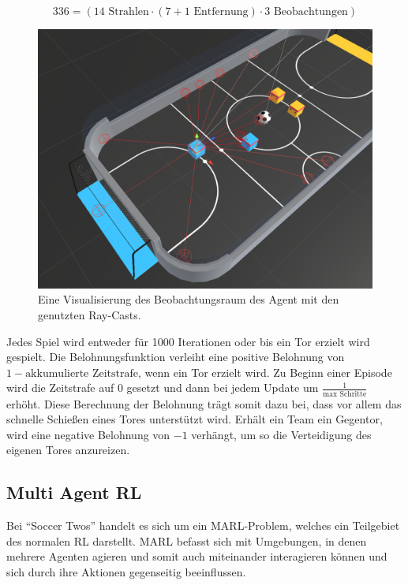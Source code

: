\documentclass[twocolumn]{webofc}
\begin{document}
\[
336 = (14 \text{ Strahlen} \cdot (7 + 1 \text{ Entfernung}) \cdot 3 \text{ Beobachtungen})
\]

\begin{figure}
	\centering
	\includegraphics[width=\columnwidth]{img/agent_observations.png}
	\caption{Eine Visualisierung des Beobachtungsraum des Agent mit den genutzten Ray-Casts.  \cite{soccertwos}}
	\label{fig:ray-casts}
\end{figure}

Jedes Spiel wird entweder für 1000 Iterationen oder bis ein Tor erzielt wird gespielt. Die Belohnungsfunktion verleiht eine positive Belohnung von \mbox{\(1 - \text{akkumulierte Zeitstrafe}\)}, wenn ein Tor erzielt wird. Zu Beginn einer Episode wird die Zeitstrafe auf \(0\) gesetzt und dann bei jedem Update um \( \frac{1}{\text{max Schritte}} \) erhöht. Diese Berechnung der Belohnung trägt somit dazu bei, dass vor allem das schnelle Schießen eines Tores unterstützt wird.  Erhält ein Team ein Gegentor, wird eine negative Belohnung von \(-1\) verhängt, um so die Verteidigung des eigenen Tores anzureizen.

\subsection{Multi Agent \acl{RL}}

Bei \enquote{Soccer Twos} handelt es sich um ein \ac{MARL}-Problem, welches ein Teilgebiet des normalen \ac{RL} darstellt. \ac{MARL} befasst sich mit Umgebungen, in denen mehrere Agenten agieren und somit auch miteinander interagieren können und sich durch ihre Aktionen gegenseitig beeinflussen.
\end{document}
